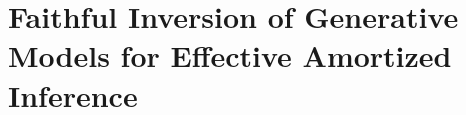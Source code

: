 \vspace{10cm}
\chapter{Faithful Inversion of Generative Models for Effective Amortized Inference}
\label{chp:posterior-server}



